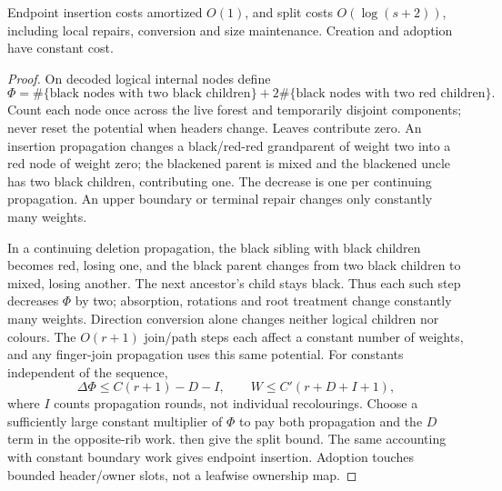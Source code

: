 \begin{lemma}
\label{lem:proof-mixed}
Endpoint insertion costs amortized $O(1)$, and split costs
$O(\log(s+2))$, including local repairs, conversion and size maintenance.
Creation and adoption have constant cost.
\end{lemma}
\begin{proof}
On decoded logical internal nodes define
\[
 \Phi=\#\{\text{black nodes with two black children}\}
       +2\#\{\text{black nodes with two red children}\}.
\]
Count each node once across the live forest and temporarily disjoint
components; never reset the potential when headers change. Leaves contribute
zero. An insertion propagation changes a black/red-red grandparent of
weight two into a red node of weight zero; the blackened parent is mixed
and the blackened uncle has two black children, contributing one.
The decrease is one per continuing propagation. An upper boundary or terminal
repair changes only constantly many weights.

In a continuing deletion propagation, the black sibling with black children
becomes red, losing one, and the black parent changes from two black children
to mixed, losing another. The next ancestor's child stays black. Thus each
such step decreases $\Phi$ by two; absorption, rotations and root treatment
change constantly many weights. Direction conversion alone changes neither
logical children nor colours. The $O(r+1)$ join/path steps each affect a
constant number of weights, and any finger-join propagation uses this same
potential. For constants independent of the sequence,
\[
 \Delta\Phi\leq C(r+1)-D-I,\qquad
 W\leq C'(r+D+I+1),
\]
where $I$ counts propagation rounds, not individual recolourings.
Choose a sufficiently large constant multiplier of $\Phi$ to pay both
propagation and the $D$ term in the opposite-rib work.
 then give the split bound.
The same accounting with constant boundary work gives endpoint insertion.
Adoption touches bounded header/owner slots, not a leafwise ownership map.
\end{proof}

